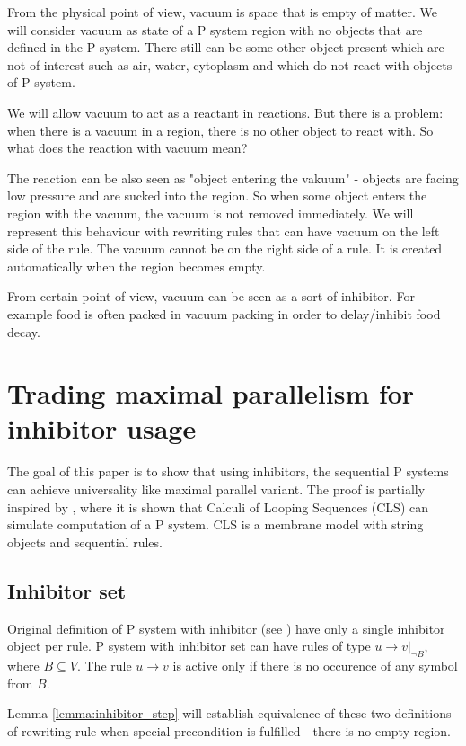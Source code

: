 \documentclass[a4paper,10pt]{article}
\begin{document}
From the physical point of view, vacuum is space that is empty of matter. We will consider vacuum as state of a P system region with no objects that are defined in the P system. There still can be some other object present which are not of interest such as air, water, cytoplasm and which do not react with objects of P system.

We will allow vacuum to act as a reactant in reactions. But there is a problem: when there is a vacuum in a region, there is no other object to react with. So what does the reaction with vacuum mean?

The reaction can be also seen as "object entering the vakuum" - objects are facing low pressure and are sucked into the region. So when some object enters the region with the vacuum, the vacuum is not removed immediately. We will represent this behaviour with rewriting rules that can have vacuum on the left side of the rule. The vacuum cannot be on the right side of a rule. It is created automatically when the region becomes empty.

From certain point of view, vacuum can be seen as a sort of inhibitor. For example food is often packed in vacuum packing in order to delay/inhibit food decay.

\section{Trading maximal parallelism for inhibitor usage}
The goal of this paper is to show that using inhibitors, the sequential P systems can achieve universality like maximal parallel variant. The proof is partially inspired by \cite{Barbuti07thecalculus}, where it is shown that Calculi of Looping Sequences (CLS) can simulate computation of a P system. CLS is a membrane model with string objects and sequential rules.

\subsection{Inhibitor set}
Original definition of P system with inhibitor (see \cite{Ionescu:jucs_10_5:on_p_systems_with}) have only a single inhibitor object per rule. P system with inhibitor set can have rules of type $u\rightarrow v|_{\neg B}$, where $B\subseteq V$. The rule $u\rightarrow v$ is active only if there is no occurence of any symbol from $B$.

Lemma \ref{lemma:inhibitor_step} will establish equivalence of these two definitions of rewriting rule when special precondition is fulfilled - there is no empty region.
\end{document}
